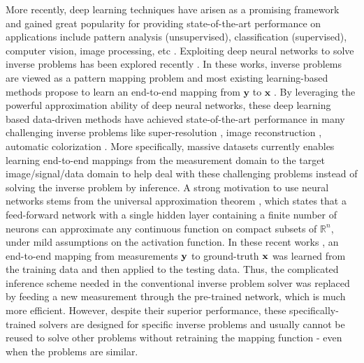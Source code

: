 \documentclass[10pt,twocolumn,letterpaper]{article}
\begin{document}
More recently, deep learning techniques have arisen as a promising framework and gained great popularity for providing state-of-the-art performance on applications include pattern analysis (unsupervised), classification (supervised), computer vision, image processing, etc \cite{Deng2014deep}. Exploiting deep neural networks to solve inverse problems has been explored recently \cite{Dong2016PAMI,sonderby2016amortised,adler2017solving,Jin2017}. 
In these works, inverse problems are viewed as a pattern mapping problem and most existing learning-based methods propose to learn an end-to-end mapping from $\mathbf{y}$ to $\mathbf{x}$ \cite{shi2016real,sonderby2016amortised}. 
By leveraging the powerful approximation ability of deep neural networks, these deep learning based data-driven methods have achieved state-of-the-art performance in many challenging inverse problems like super-resolution \cite{bruna2015super,Dong2016PAMI,sonderby2016amortised}, image reconstruction \cite{schlemper2017deep}, automatic colorization \cite{larsson2016learning}. 
More specifically, massive datasets currently enables learning end-to-end mappings from the measurement domain to the target image/signal/data domain to help deal with these challenging problems instead of solving the inverse problem by inference. 
A strong motivation to use neural networks stems from the universal approximation theorem \cite{Csaji2001}, which states that a feed-forward  network with a single hidden layer containing a finite number of neurons can approximate any continuous function on compact subsets of $\mathbb{R}^{n}$, under mild assumptions on the activation function. 
In these recent works \cite{bruna2015super, sonderby2016amortised, larsson2016learning, schlemper2017deep}, an end-to-end mapping from measurements ${\mathbf{y}}$ to ground-truth ${\mathbf{x}}$ was learned from the training data and then applied to the testing data. 
Thus, the complicated inference scheme needed in the conventional inverse problem solver was replaced by feeding a new measurement through the pre-trained network, which is much more efficient. 
However, despite their superior performance, these specifically-trained solvers are designed for specific inverse problems and usually cannot be reused to solve other problems without retraining the mapping function - even when the problems are similar. 
\end{document}
